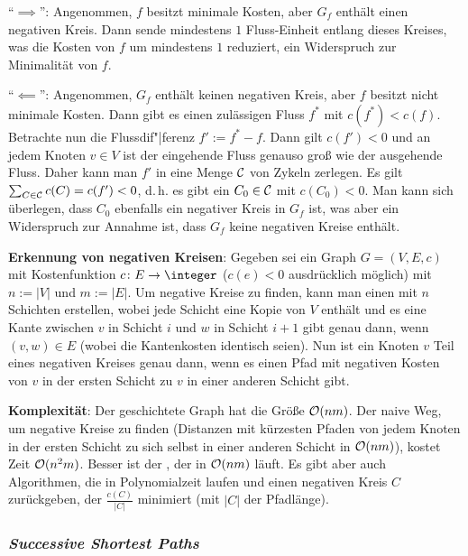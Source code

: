 \begin{Beweis}
    "`$\implies$"':
    Angenommen, $f$ besitzt minimale Kosten, aber $G_f$ enthält einen negativen Kreis.
    Dann sende mindestens $1$ Fluss-Einheit entlang dieses Kreises, was die Kosten von $f$
    um mindestens $1$ reduziert, ein Widerspruch zur Minimalität von $f$.
    
    "`$\impliedby$"':
    Angenommen, $G_f$ enthält keinen negativen Kreis, aber $f$ besitzt nicht minimale Kosten.
    Dann gibt es einen zulässigen Fluss $f^\ast$ mit $c(f^\ast) < c(f)$.
    Betrachte nun die Flussdif"|ferenz $f' := f^\ast - f$.
    Dann gilt $c(f') < 0$ und an jedem Knoten $v \in V$ ist der eingehende Fluss
    genauso groß wie der ausgehende Fluss.
    Daher kann man $f'$ in eine Menge $\mathcal{C}$ von Zykeln zerlegen.
    Es gilt $\sum_{C \in \mathcal{C}} c(C) = c(f') < 0$,
    d.\,h. es gibt ein $C_0 \in \mathcal{C}$ mit $c(C_0) < 0$.
    Man kann sich überlegen, dass $C_0$ ebenfalls ein negativer Kreis in $G_f$ ist,
    was aber ein Widerspruch zur Annahme ist, dass $G_f$ keine negativen Kreise enthält.
\end{Beweis}

\linie

\textbf{Erkennung von negativen Kreisen}:
Gegeben sei ein Graph $G = (V, E, c)$ mit Kostenfunktion $c\colon E \to \integer$
($c(e) < 0$ ausdrücklich möglich) mit $n := |V|$ und $m := |E|$.
Um negative Kreise zu finden, kann man einen  mit $n$ Schichten
erstellen, wobei jede Schicht eine Kopie von $V$ enthält und es
eine Kante zwischen $v$ in Schicht $i$ und $w$ in Schicht $i+1$ gibt genau dann, wenn
$(v, w) \in E$ (wobei die Kantenkosten identisch seien).
Nun ist ein Knoten $v$ Teil eines negativen Kreises genau dann, wenn
es einen Pfad mit negativen Kosten von $v$ in der ersten Schicht zu $v$ in einer anderen Schicht
gibt.

\textbf{Komplexität}:
Der geschichtete Graph hat die Größe $\mathcal{O}(nm)$.
Der naive Weg, um negative Kreise zu finden (Distanzen mit kürzesten Pfaden von jedem Knoten in
der ersten Schicht zu sich selbst in einer anderen Schicht in $\mathcal{O}(nm)$), kostet Zeit $\mathcal{O}(n^2 m)$.
Besser ist der , der in $\mathcal{O}(nm)$ läuft.
Es gibt aber auch Algorithmen, die in Polynomialzeit laufen und einen negativen Kreis
$C$ zurückgeben, der $\frac{c(C)}{|C|}$ minimiert (mit $|C|$ der Pfadlänge).

\pagebreak

\subsubsection{%
    \emph{Successive Shortest Paths}%
}

